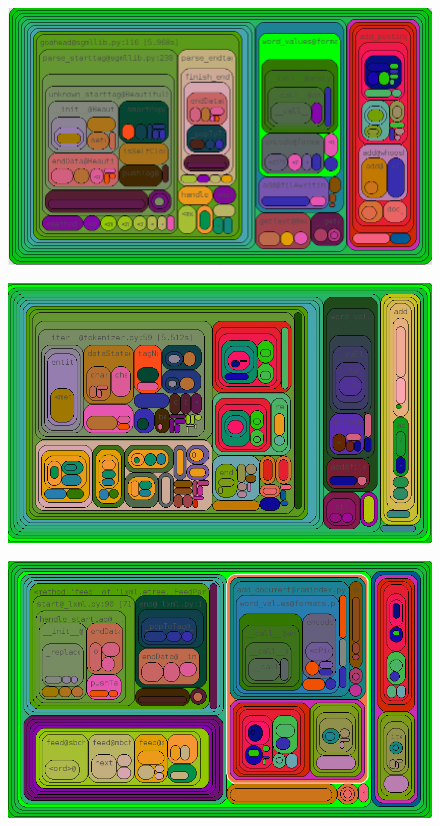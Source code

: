 \documentclass[12pt,twoside,notitlepage]{report}
\begin{document}
\begin{figure}
\centering
\begin{minipage}{.3\textwidth}
  \centering
  \includegraphics[width=\linewidth]{figs/prof.png}
  \label{fig:test1}
\end{minipage}
\begin{minipage}{.3\textwidth}
  \centering
  \includegraphics[width=\linewidth]{figs/html5.png}
  \label{fig:test2}
\end{minipage}
\begin{minipage}{.3\textwidth}
  \centering
  \includegraphics[width=\linewidth]{figs/lxml.png}

\end{minipage}
\end{figure}
\end{document}

